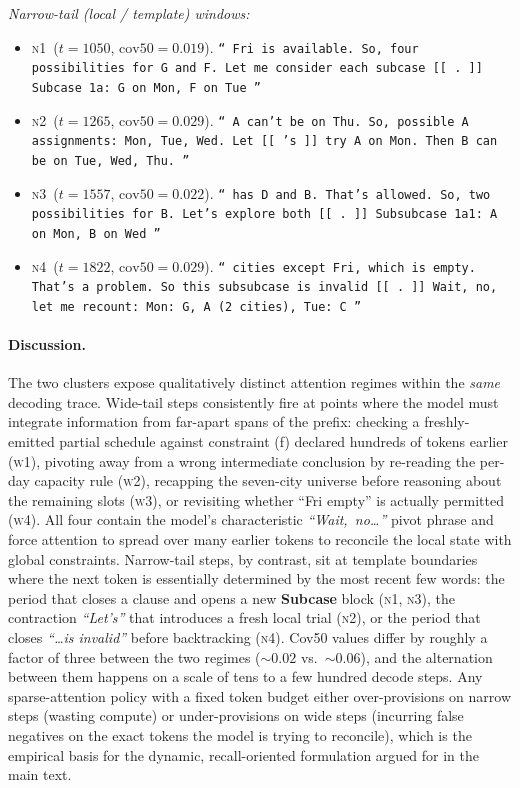 \textit{Narrow-tail (local / template) windows:}
\begin{itemize}\itemsep1pt
  \item \textsc{n1} \,($t{=}1050$, $\mathrm{cov50}{=}0.019$).
    \texttt{``\,Fri is available. So, four possibilities for G and F. Let me
    consider each subcase [[\,.\,]] \textbf{Subcase 1a: G on Mon, F on
    Tue}\,''}
  \item \textsc{n2} \,($t{=}1265$, $\mathrm{cov50}{=}0.029$).
    \texttt{``\,A can't be on Thu. So, possible A assignments: Mon, Tue,
    Wed. Let [[\,'s\,]] try A on Mon. Then B can be on Tue, Wed, Thu.\,''}
  \item \textsc{n3} \,($t{=}1557$, $\mathrm{cov50}{=}0.022$).
    \texttt{``\,has D and B. That's allowed. So, two possibilities for B.
    Let's explore both [[\,.\,]] \textbf{Subsubcase 1a1: A on Mon, B on
    Wed}\,''}
  \item \textsc{n4} \,($t{=}1822$, $\mathrm{cov50}{=}0.029$).
    \texttt{``\,cities except Fri, which is empty. That's a problem. So this
    subsubcase is invalid [[\,.\,]] Wait, no, let me recount: Mon: G, A
    (2 cities), Tue: C\,''}
\end{itemize}

\paragraph{Discussion.}
The two clusters expose qualitatively distinct attention regimes within the
\emph{same} decoding trace. Wide-tail steps consistently fire at points where
the model must integrate information from far-apart spans of the prefix:
checking a freshly-emitted partial schedule against constraint (f) declared
hundreds of tokens earlier (\textsc{w1}), pivoting away from a wrong
intermediate conclusion by re-reading the per-day capacity rule (\textsc{w2}),
recapping the seven-city universe before reasoning about the remaining slots
(\textsc{w3}), or revisiting whether ``Fri empty'' is actually permitted
(\textsc{w4}). All four contain the model's characteristic
\textit{``Wait,~no\dots''} pivot phrase and force attention to spread over
many earlier tokens to reconcile the local state with global constraints.
Narrow-tail steps, by contrast, sit at template boundaries where the next
token is essentially determined by the most recent few words: the period
that closes a clause and opens a new \textbf{Subcase} block (\textsc{n1},
\textsc{n3}), the contraction \textit{``Let's''} that introduces a fresh
local trial (\textsc{n2}), or the period that closes
\textit{``\dots is invalid''} before backtracking (\textsc{n4}). Cov50 values
differ by roughly a factor of three between the two regimes
($\sim0.02$ vs.\ $\sim0.06$), and the alternation between them happens on a
scale of tens to a few hundred decode steps. Any sparse-attention policy
with a fixed token budget either over-provisions on narrow steps (wasting
compute) or under-provisions on wide steps (incurring false negatives on the
exact tokens the model is trying to reconcile), which is the empirical basis
for the dynamic, recall-oriented formulation argued for in the main text.
